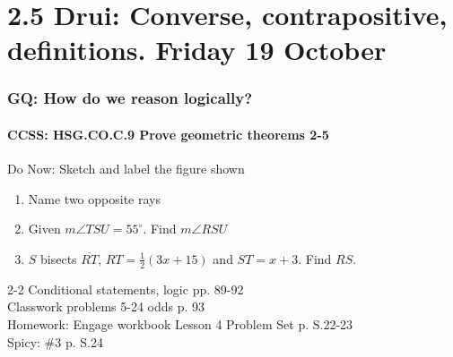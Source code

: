 \documentclass{beamer}
\begin{document}
\section{2.5 Drui: Converse, contrapositive, definitions. Friday 19 October}
  \frame
  {
    \frametitle{GQ: How do we reason logically?}
    \framesubtitle{CCSS: HSG.CO.C.9 Prove geometric theorems  \alert{2-5}}

    \begin{block}{Do Now: Sketch and label the figure shown}
      \begin{center}
      \end{center}
      \begin{enumerate}
      \item Name two opposite rays
      \item Given $m\angle TSU = 55^\circ$. Find $m\angle RSU$
      \item $S$ bisects $\overline{RT}$, $RT=\frac{1}{2} (3x+15)$ and $ST = x+3$. Find $RS$.
    \end{enumerate}
    \end{block}
    2-2 Conditional statements, logic  pp. 89-92\\
    Classwork problems 5-24 odds p. 93\\
    Homework: Engage workbook Lesson 4 Problem Set p. S.22-23 \\
    Spicy: \#3 p. S.24
  }
\end{document}
